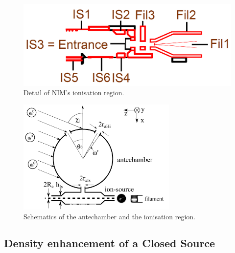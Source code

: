 	\begin{figure}[h]
		\centering
		\includegraphics[width= .5\textwidth]{Bilder/NIM_schema_zoom_IS.png}
		\caption{Detail of NIM's ionisation region.}
		\label{fig:ISZoom}
	\end{figure}
	\begin{figure}[h]
		\centering
		\includegraphics[width= 0.7\textwidth]{Bilder/particleDensEnh.png}
		\caption{Schematics of the antechamber and the ionisation region.}
		\label{fig:thAntIs}
	\end{figure}

	\subsection{Density enhancement of a Closed Source }\label{subsubsec:Densenhan}
	
